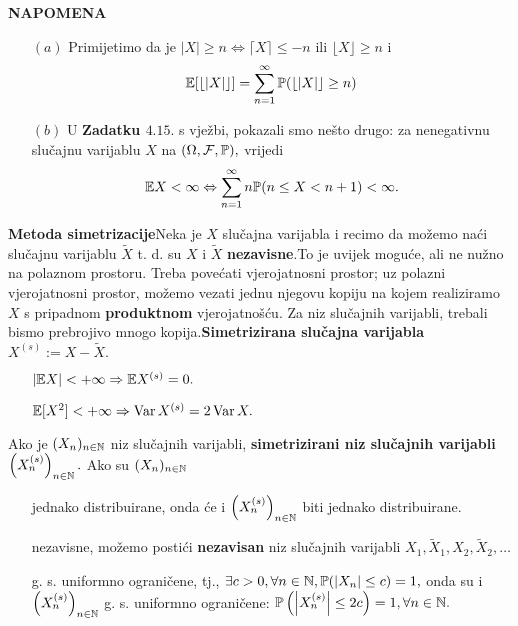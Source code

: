 \documentclass{article}
\newcommand{\Var}{\operatorname{Var}}
\begin{document}
 \textbf{NAPOMENA}
 \begin{enumerate}
     \item[\((a)\)] Primijetimo da je \(|X|\ge n\Leftrightarrow\lceil X\rceil\le-n\text{ ili }\lfloor X\rfloor\ge n\) i \[\Bbb E[\lfloor|X|\rfloor]=\sum_{n=1}^\infty\Bbb P(\lfloor |X|\rfloor\ge n)\]
     \item[\((b)\)] U \textbf{Zadatku \(4.15.\)} s vježbi, pokazali smo nešto drugo: za  nenegativnu slučajnu varijablu \(X\) na \((\Omega,\mathcal F,\Bbb P),\) vrijedi \[\Bbb EX<\infty\Leftrightarrow\sum_{n=1}^\infty n\Bbb P(n\le X<n+1)<\infty.\] 
 \end{enumerate}
 \newpage\restoregeometry
 \textbf{Metoda simetrizacije}\newline Neka je \(X\) slučajna varijabla i recimo da možemo naći slučajnu varijablu \(\tilde X\) t. d. su \(X\) i \(\tilde X\) \textbf{nezavisne}.\newline To je uvijek moguće, ali ne nužno na polaznom prostoru. Treba povećati vjerojatnosni prostor; uz polazni vjerojatnosni prostor, možemo vezati jednu njegovu kopiju na kojem realiziramo \(X\) s pripadnom \textbf{produktnom} vjerojatnošću. Za niz slučajnih varijabli, trebali bismo prebrojivo mnogo kopija.\newline\textbf{Simetrizirana slučajna varijabla} \(X^{(s)}:=X-\tilde X.\) 
 \begin{itemize}
     \item[] \(|\Bbb EX|<+\infty\Rightarrow\Bbb EX^{(s)}=0.\)
     \item[] \(\Bbb E[X^2]<+\infty\Rightarrow\Var X^{(s)}=2\Var X.\)
 \end{itemize}
 Ako je \((X_n)_{n\in\Bbb N}\) niz slučajnih varijabli, \textbf{simetrizirani niz slučajnih varijabli} \(\left(X_n^{(s)}\right)_{n\in\Bbb N}.\) Ako su \((X_n)_{n\in\Bbb N}\)
 \begin{itemize}
     \item[\ding{228}] jednako distribuirane, onda će i \(\left(X_n^{(s)}\right)_{n\in\Bbb N}\) biti jednako distribuirane.
     \item[\ding{228}] nezavisne, možemo postići \textbf{nezavisan} niz slučajnih varijabli \(X_1,\tilde X_1,X_2,\tilde X_2,\ldots\)
     \item[\ding{228}] g. s. uniformno ograničene, tj., \(\exists c>0,\forall n\in\Bbb N,\Bbb P(|X_n|\le c)=1,\) onda su i \(\left(X_n^{(s)}\right)_{n\in\Bbb N}\) g. s. uniformno ograničene: \(\Bbb P\left(\left|X_n^{(s)}\right|\le 2c\right)=1,\forall n\in\Bbb N.\)
 \end{itemize}
\end{document}
